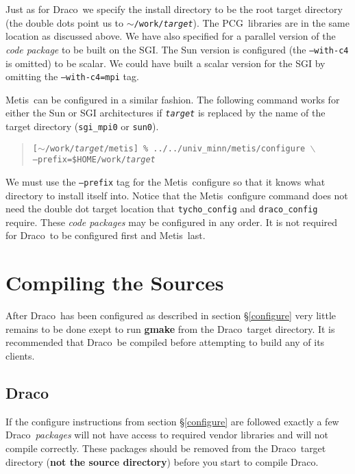\documentclass[10pt]{nmemo}
\newcommand{\comp}[1]{\normalfont\normalsize\texttt{#1}}
\newcommand{\draco}{{\normalfont\sffamily Draco}}
\newcommand{\metis}{{\normalfont\sffamily Metis}}
\newcommand{\pcg}{{\normalfont\sffamily PCG}}
\begin{document}
Just as for \draco\ we specify the install directory to be the root
target directory (the double dots point us to
\comp{$\sim$/work/\emph{target}}).  The \pcg\ libraries are in the
same location as discussed above.  We have also specified for a
parallel version of the \emph{code package} to be built on the SGI.
The Sun version is configured (the \comp{--with-c4} is omitted) to be
scalar.  We could have built a scalar version for the SGI by omitting
the \comp{--with-c4=mpi} tag.

\metis\ can be configured in a similar fashion.  The following command
works for either the Sun or SGI architectures if \comp{\emph{target}}
is replaced by the name of the target directory (\comp{sgi\_mpi0} or
\comp{sun0}).

\footnotesize
\begin{verse}
\texttt{[$\sim$/work/\emph{target}/metis] \%
../../univ\_minn/metis/configure $\backslash$\\
\hspace{0.5in}--prefix=\${HOME}/work/\emph{target}}
\end{verse}
\normalsize

We must use the \comp{--prefix} tag for the \metis\ configure so that
it knows what directory to install itself into.  Notice that the
\metis\ configure command does not need the double dot target location
that \comp{tycho\_config} and \comp{draco\_config} require.  These
\emph{code packages} may be configured in any order.  It is not
required for \draco\ to be configured first and \metis\ last.


\section{Compiling the Sources}
\label{compile}

After \draco\ has been configured as described in section
\S\ref{configure} very little remains to be done exept to run
\textbf{gmake} from the \draco\ target directory.  It is recommended
that \draco\ be compiled before attempting to build any of its
clients. 

\subsection{\draco}

If the configure instructions from section \S\ref{configure} are
followed exactly a few \draco\ \emph{packages} will not have access to
required vendor libraries and will not compile correctly.  These
packages should be removed from the \draco\ target directory
(\textbf{not the source directory}) before you start to compile
\draco.
\end{document}
